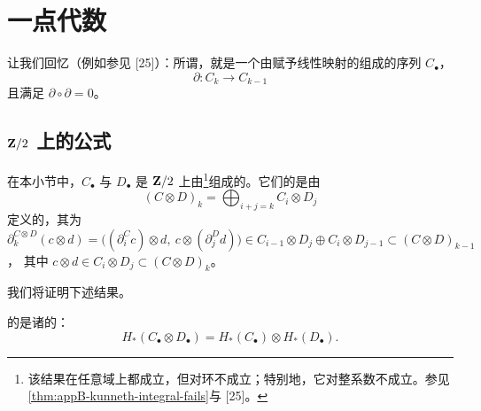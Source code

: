 
\section{一点代数\trHomology}
\label{sec:appB-algebraic-homology}

让我们回忆（例如参见 [25]）：所谓\trChainComplex，就是一个由赋予线性映射的\trModule{}组成的序列 $C_{\bullet}$，
\[
\partial : C_k \longrightarrow C_{k-1}
\]
且满足 $\partial \circ \partial = 0$。

\subsection{\texorpdfstring{$\mathbf{Z}/2$}{Z/2} 上的\trKunneth{}公式}
\label{subsec:appB-kunneth-z2}

在本小节中，$C_{\bullet}$ 与 $D_{\bullet}$ 是 $\mathbf{Z}/2$ 上由\trVectorSpace\footnote{该结果在任意域上都成立，但对环不成立；特别地，它对整系数\trHomology{}不成立。参见\cref{thm:appB-kunneth-integral-fails}与 [25]。}组成的\trComplex。它们的\trTensorProduct{}是由
\[
(C \otimes D)_k = \bigoplus_{i+j=k} C_i \otimes D_j
\]
定义的\trComplex，其\trBoundaryOperator{}为
$\partial_k^{C \otimes D}(c \otimes d) = \bigl( (\partial_i^C c) \otimes d,\ c \otimes (\partial_j^D d) \bigr) \in C_{i-1} \otimes D_j \oplus C_i \otimes D_{j-1} \subset (C \otimes D)_{k-1}$，
其中 $c \otimes d \in C_i \otimes D_j \subset (C \otimes D)_k$。

我们将证明下述结果。

\begin{proposition}\label{thm:appB-kunneth-tensor-product}
\trTensorProduct\trComplex{}的\trHomology{}是诸\trHomology{}的\trTensorProduct：
\[
H_*(C_{\bullet} \otimes D_{\bullet}) = H_*(C_{\bullet}) \otimes H_*(D_{\bullet}).
\]
\end{proposition}

